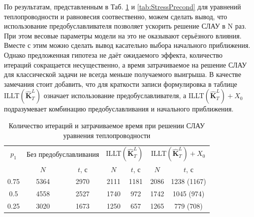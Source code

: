 По результатам, представленным в Таб. \ref{tab:ThermalPrecond} и \ref{tab:StressPrecond} для уравнений теплопроводности и равновесия соотвественно, можем сделать вывод, что использование предобуславливателя позволяет ускорить решение СЛАУ в N раз. При этом весовые параметры модели на это не оказывают серьёзного влияния. Вместе с этим можно сделать вывод касательно выбора начального приближения. Однако предложенная гипотеза не даёт ожидаемого эффекта, количество итераций сокращается несущественно, а время затрачиваемое на решение СЛАУ для классической задачи не всегда меньше получаемого выигрыша. В качестве замечания стоит добавить, что для краткости записи формулировка в таблице ILLT$\left( \widehat{\textbf{K}}^L_T \right)$ означает использование предобуславливателя, а ILLT$\left( \widehat{\textbf{K}}^L_T \right) + X_0$ подразумевает комбинацию предобуславливания и начального приближения.

\begin{table}[htbp]
    \centering
    \begin{threeparttable}%
        \caption{Количество итераций и затрачиваемое время при решении СЛАУ уравнения теплопроводности}\label{tab:ThermalPrecond}
        \begin{tabular}{|c|c|c|c|c|c|c|}
		\hline
		$p_1$ & \multicolumn{2}{c|}{Без предобуславливания} & \multicolumn{2}{c|}{ILLT$\left( \widehat{\textbf{K}}^L_T \right)$} & \multicolumn{2}{c|}{ILLT$\left( \widehat{\textbf{K}}^L_T \right) + X_0$}\\
		\cline{2-7}
		     & $N$ & $t$, с & $N$ & $t$, с & $N$ & $t$, с \\
		\hline
		0.75 & 5364 & 2970 & 2111 & 1181 & 2086 & 1238 (1167) \\
		\hline
		0.5  & 4558 & 2527 & 1740 & 972 & 1742 & 1045 (974) \\
		\hline
		0.25 & 3020 & 1673 & 1250 & 657 & 1265 & 779 (708) \\
		\hline
        \end{tabular}
    \end{threeparttable}
\end{table}

